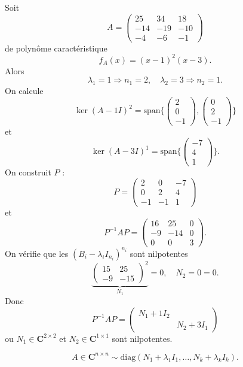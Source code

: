 \begin{example}
Soit
$$
A=\begin{pmatrix}
25 & 34 & 18 \\
-14 & -19 & -10 \\
-4 & -6 & -1 
\end{pmatrix}
$$
de polynôme caractéristique
$$
f_{A}(x)=(x-1)^{2}(x-3).
$$
Alors
$$
\lambda_{1}=1\Rightarrow n_{1}=2,\quad \lambda_{2}=3\Rightarrow n_{2}=1.
$$
On calcule
$$
\ker(A-1I)^{2}=\mathrm{span}\{ \begin{pmatrix}
2 \\
0 \\
-1
\end{pmatrix}, \begin{pmatrix}
0 \\
2 \\
-1
\end{pmatrix} \}
$$
et
$$
\ker(A-3I)^{1}=\mathrm{span}\{ \begin{pmatrix}
-7 \\
4 \\
1
\end{pmatrix}\}.
$$
On construit $P$ :
$$
P=\begin{pmatrix}
2 & 0 & -7 \\
0 & 2 & 4 \\
-1 & -1  & 1
\end{pmatrix}
$$
et
$$
P^{-1}AP=\begin{pmatrix}
16 & 25 & 0 \\
-9 & -14 & 0 \\
0 & 0 & 3
\end{pmatrix}.
$$
On vérifie que les $(B_{i}-\lambda _{i}I_{n_{i}})^{n_{i}}$ sont nilpotentes
$$
\underbrace{ \begin{pmatrix}
15 & 25 \\
-9 & -15
\end{pmatrix}^{2} }_{ N_{1} }=0, \quad N_{2}=0=0.
$$
Donc
$$
P^{-1}AP=\begin{pmatrix}
N_{1}+1I_{2} \\
 & N_{2}+3I_{1}
\end{pmatrix}
$$
ou $N_{1}\in \mathbf{C}^{2\times2}$ et $N_{2}\in \mathbf{C}^{1\times 1}$ sont nilpotentes.
\end{example}
\begin{reminder}
$$
A\in \mathbf{C}^{n\times n}\sim \mathrm{diag}(N_{1}+\lambda_{1}I_{1},\dots,N_{k}+\lambda _{k}I_{k}).
$$
\end{reminder}

